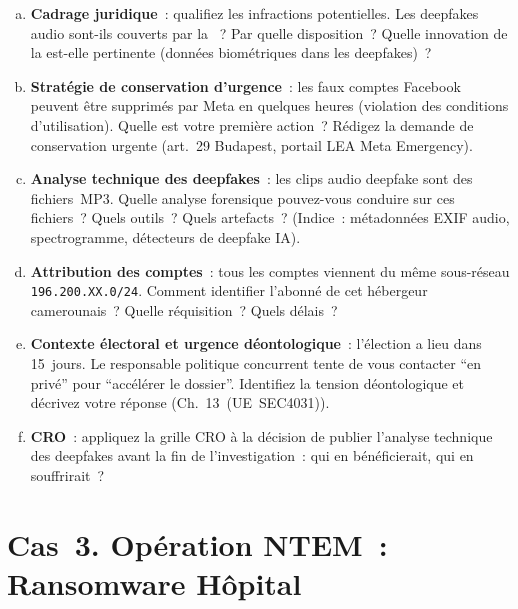 \begin{boxexo}[title={\ding{45}\quad MUNGO. Investigation complète}]
\begin{enumerate}[(a)]
    \item \textbf{Cadrage juridique}~: qualifiez les infractions
          potentielles. Les deepfakes audio sont-ils couverts par
          la ~? Par quelle disposition~?
          Quelle innovation de la  est-elle pertinente
          (données biométriques dans les deepfakes)~?
    \item \textbf{Stratégie de conservation d'urgence}~: les faux
          comptes Facebook peuvent être supprimés par Meta en quelques
          heures (violation des conditions d'utilisation). Quelle est
          votre première action~? Rédigez la demande de conservation
          urgente (art.~29 Budapest, portail LEA Meta Emergency).
    \item \textbf{Analyse technique des deepfakes}~: les clips audio
          deepfake sont des fichiers~MP3. Quelle analyse forensique
          pouvez-vous conduire sur ces fichiers~? Quels outils~?
          Quels artefacts~? (Indice~: métadonnées EXIF audio,
          spectrogramme, détecteurs de deepfake IA).
    \item \textbf{Attribution des comptes}~: tous les comptes viennent
          du même sous-réseau \texttt{196.200.XX.0/24}. Comment
          identifier l'abonné de cet hébergeur camerounais~?
          Quelle réquisition~? Quels délais~?
    \item \textbf{Contexte électoral et urgence déontologique}~:
          l'élection a lieu dans 15~jours. Le responsable politique
          concurrent tente de vous contacter ``en privé'' pour
          ``accélérer le dossier''. Identifiez la tension déontologique
          et décrivez votre réponse (Ch.~13~(UE~SEC4031)).
    \item \textbf{CRO}~: appliquez la grille CRO à la décision de
          publier l'analyse technique des deepfakes avant la fin
          de l'investigation~: qui en bénéficierait, qui en
          souffrirait~?
\end{enumerate}
\end{boxexo}

\section{Cas~3. Opération NTEM~: Ransomware Hôpital}
\label{sec:cas-sanaga}

